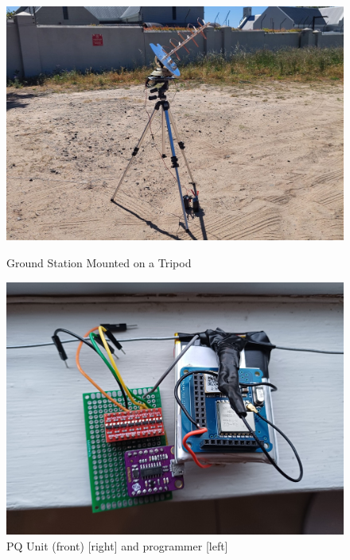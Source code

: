 \begin{figure}[!htb]
  \begin{minipage}{.49\textwidth}
    \centering
    \includegraphics[width=0.95\linewidth]{gsTripod}
    \caption{Ground Station Mounted on a Tripod}
    \label{fig:gsTripod}
  \end{minipage}
  \begin{minipage}{.49\textwidth}
    \centering
    \includegraphics[width=0.85\linewidth]{pqUnitPCB}
    \caption{PQ Unit (front) [right] and programmer [left]}
    \label{fig:pqUnitPCB}
  \end{minipage}
\end{figure}